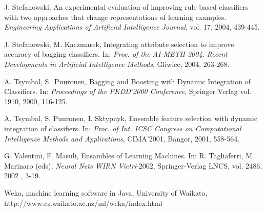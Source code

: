 \documentclass[runningheads]{llncs}
\begin{document}
\begin{thebibliography}{19}
%
%

J. Stefanowski, An experimental evaluation of improving rule based
classifiers with two approaches that change representations of learning
examples. \emph{Engineering Applications of Artificial Intelligence
Journal}, vol. 17, 2004, 439-445.


J. Stefanowski, M. Kaczmarek, Integrating attribute selection  to improve
accuracy of bagging classifiers. In: \emph{Proc. of the AI-METH 2004. Recent
Developments in Artificial Intelligence Methods},  Gliwice,  2004, 263-268.

 A. Tsymbal, S.~Puuronen, Bagging and Boosting with
Dynamic Integration of Classifiers. In: \emph{Proceedings of the PKDD'2000
Conference}, Springer Verlag vol. 1910, 2000, 116-125.

 A. Tsymbal, S. Puuronen, I. Sktypnyk, Ensemble feature
selection with dynamic integration of classifiers. In: \emph{Proc. of Int.
ICSC Congress on Computational Intelligence Methods and Applications},
CIMA'2001, Bangor, 2001, 558-564.
%

  G. Valentini, F. Masuli, Ensambles of Learning
Machines. In: R. Tagliaferri, M. Marinaro (eds), \emph{Neural Nets WIRN
Vietri}-2002, Springer-Verlag LNCS, vol. 2486, 2002 , 3-19.


 Weka, machine learning software in Java, University of Waikato,
http://www.cs.waikato.ac.nz/ml/weka/index.html


\end{thebibliography}
\end{document}

